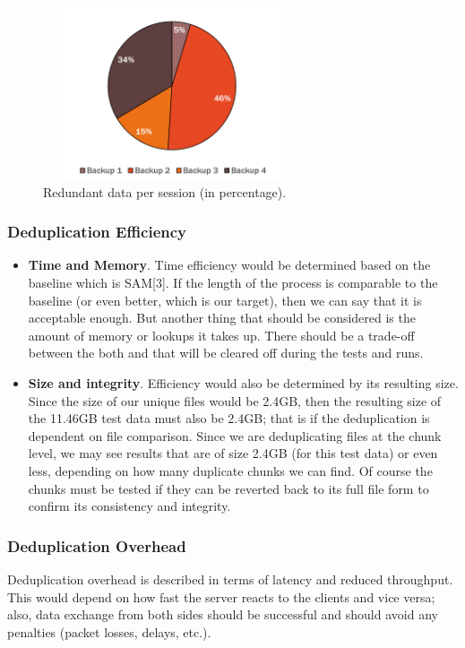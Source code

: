 \documentclass[journal]{IEEEtran}
\begin{document}
\begin{figure}[!t]
\centering
\includegraphics[height=2in, width=3in]{image3.png}
\caption{Redundant data per session (in percentage).}
\end{figure}

\subsubsection{Deduplication Efficiency}
\begin{itemize}
\item \textbf{Time and Memory}. Time efficiency would be determined based on the baseline which is SAM[3]. If the length of the process is comparable to the baseline (or even better, which is our target), then we can say that it is acceptable enough. But another thing that should be considered is the amount of memory or lookups it takes up. There should be a trade-off between the both and that will be cleared off during the tests and runs.
\item \textbf{Size and integrity}. Efficiency would also be determined by its resulting size. Since the size of our unique files would be 2.4GB, then the resulting size of the 11.46GB test data must also be 2.4GB; that is if the deduplication is dependent on file comparison. Since we are deduplicating files at the chunk level, we may see results that are of size 2.4GB (for this test data) or even less, depending on how many duplicate chunks we can find. Of course the chunks must be tested if they can be reverted back to its full file form to confirm its consistency and integrity.
\end{itemize}

\subsubsection{Deduplication Overhead}
Deduplication overhead is described in terms of latency and reduced throughput. This would depend on how fast the server reacts to the clients and vice versa; also, data exchange from both sides should be successful and should avoid any penalties (packet losses, delays, etc.).
\end{document}
